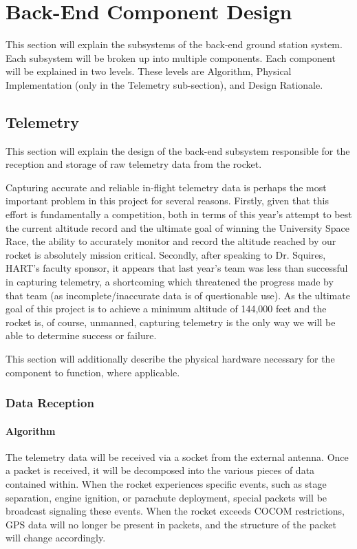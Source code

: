 \documentclass[journal,10pt,onecolumn,compsoc]{IEEEtran}
\begin{document}

\section{Back-End Component Design}
	This section will explain the subsystems of the back-end ground station system.
	Each subsystem will be broken up into multiple components.
	Each component will be explained in two levels.
	These levels are Algorithm, Physical Implementation (only in the Telemetry sub-section), and Design Rationale.

	\subsection{Telemetry}
		\noindent This section will explain the design of the back-end subsystem responsible for the reception and storage of raw telemetry data from the rocket.
		
		\noindent Capturing accurate and reliable in-flight telemetry data is perhaps the most important problem in this project for several reasons. 
		Firstly, given that this effort is fundamentally a competition, both in terms of this year's attempt to best the current altitude record and the ultimate goal of winning the University Space Race, the ability to accurately monitor and record the altitude reached by our rocket is absolutely mission critical. 
		Secondly, after speaking to Dr. Squires, HART's faculty sponsor, it appears that last year's team was less than successful in capturing telemetry, a shortcoming which threatened the progress made by that team (as incomplete/inaccurate data is of questionable use). 
		As the ultimate goal of this project is to achieve a minimum altitude of 144,000 feet and the rocket is, of course, unmanned, capturing telemetry is the only way we will be able to determine success or failure.
		
		\noindent This section will additionally describe the physical hardware necessary for the component to function, where applicable.
		\setlength\parindent{0pt}
		\subsubsection{Data Reception}

			\paragraph{Algorithm}
				\noindent The telemetry data will be received via a socket from the external antenna.
				Once a packet is received, it will be decomposed into the various pieces of data contained within.
				When the rocket experiences specific events, such as stage separation, engine ignition, or parachute deployment, special packets will be broadcast signaling these events.
				When the rocket exceeds COCOM restrictions, GPS data will no longer be present in packets, and the structure of the packet will change accordingly.
\end{document}
